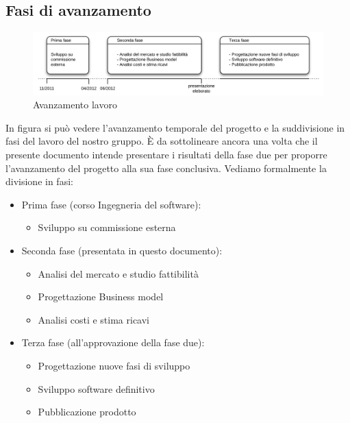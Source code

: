 \subsection{Fasi di avanzamento}

\vspace*{0.5cm}

\begin{figure}[H]
\centering
\includegraphics[scale=0.7]{images/avanzamento.png}
\caption{Avanzamento lavoro}
\end{figure} 

\vspace*{0.5cm}

In figura  si può vedere l'avanzamento temporale del progetto e la suddivisione in fasi del lavoro del nostro gruppo. È da sottolineare ancora una volta che il presente documento intende presentare i risultati della fase due per proporre l'avanzamento del progetto alla sua fase conclusiva. Vediamo formalmente la divisione in fasi: \\

\begin{itemize}
\item Prima fase (corso Ingegneria del software):
\begin{itemize}
\item Sviluppo su commissione esterna 
\end{itemize}
\end{itemize}

\begin{itemize}
\item Seconda fase (presentata in questo documento):
\begin{itemize}
\item Analisi del mercato e studio fattibilità
\item Progettazione Business model
\item Analisi costi e stima ricavi
\end{itemize}
\end{itemize}

\begin{itemize}
\item Terza fase (all'approvazione della fase due):
\begin{itemize}
\item Progettazione nuove fasi di sviluppo
\item Sviluppo software definitivo
\item Pubblicazione prodotto
\end{itemize}
\end{itemize}

